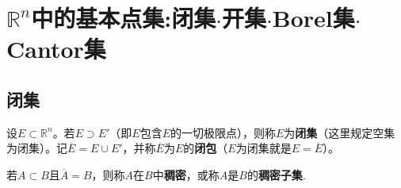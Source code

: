 \documentclass[../../main.tex]{subfiles}
\begin{document}
\section{$\mathbb{R}^n$中的基本点集:闭集$\cdot$开集$\cdot$Borel集$\cdot$Cantor集}

\subsection{闭集}

\begin{definition}[闭集与闭包]\label{definition:闭集与闭包}
设\(E\subset\mathbb{R}^n\)。若\(E\supset E'\)（即\(E\)包含\(E\)的一切极限点），则称\(E\)为\textbf{闭集}（这里规定空集为闭集）。记\(\overline{E}=E\cup E'\)，并称\(\overline{E}\)为\(E\)的\textbf{闭包}（\(E\)为闭集就是\(E = \overline{E}\)）。
\end{definition}

\begin{definition}[稠密子集]\label{definition:稠密子集}
  若\(A\subset B\)且\(\overline{A}=B\)，则称\(A\)在\(B\)中\textbf{稠密}，或称\(A\)是\(B\)的\textbf{稠密子集}.
\end{definition}
\end{document}
